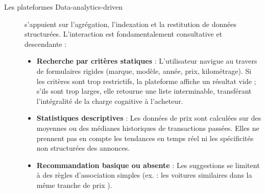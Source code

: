 \documentclass[11pt,a4paper]{article}
\begin{document}
\begin{description}
    \item[Les plateformes Data-analytics-driven] s'appuient sur l'agrégation, l'indexation et la restitution de données structurées. L'interaction est fondamentalement consultative et descendante :
    \begin{itemize}
        \item \textbf{Recherche par critères statiques} : L'utilisateur navigue au travers de formulaires rigides (marque, modèle, année, prix, kilométrage). Si les critères sont trop restrictifs, la plateforme affiche un résultat vide ; s'ils sont trop larges, elle retourne une liste interminable, transférant l'intégralité de la charge cognitive à l'acheteur.
        \item \textbf{Statistiques descriptives} : Les données de prix sont calculées sur des moyennes ou des médianes historiques de transactions passées. Elles ne prennent pas en compte les tendances en temps réel ni les spécificités non structurées des annonces.
        \item \textbf{Recommandation basique ou absente} : Les suggestions se limitent à des règles d'association simples (ex. : \og les voitures similaires dans la même tranche de prix \fg).
    \end{itemize}


\end{description}
\end{document}
